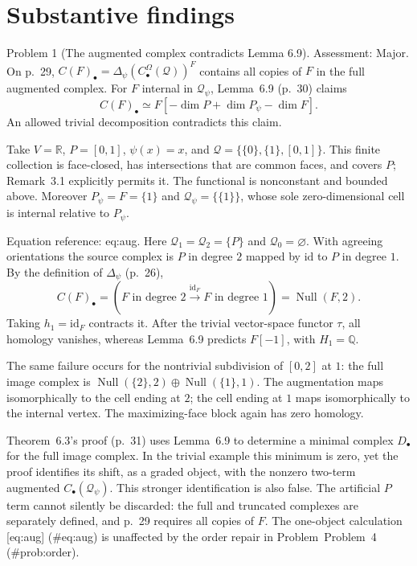 \documentclass[10pt]{article}
\begin{document}
\section*{Substantive findings}
Problem 1 (The augmented complex contradicts Lemma 6.9).  Assessment: Major. On p. 29, \(C(F)_\bullet=\Delta_\psi(C_\bullet^\Omega(\mathcal Q))^F\) contains all copies of \(F\) in the full augmented complex. For \(F\) internal in \(\mathcal Q_\psi\), Lemma 6.9 (p. 30) claims \[C(F)_\bullet\simeq F[-\dim P+\dim P_\psi-\dim F].\] An allowed trivial decomposition contradicts this claim.\par
Take \(V=\mathbb R\), \(P=[0,1]\), \(\psi(x)=x\), and \(\mathcal Q=\{\{0\},\{1\},[0,1]\}\). This finite collection is face-closed, has intersections that are common faces, and covers \(P\); Remark 3.1 explicitly permits it. The functional is nonconstant and bounded above. Moreover \(P_\psi=F=\{1\}\) and \(\mathcal Q_\psi=\{\{1\}\}\), whose sole zero-dimensional cell is internal relative to \(P_\psi\).\par
Equation reference: eq:aug. Here \(\mathcal Q_1=\mathcal Q_2=\{P\}\) and \(\mathcal Q_0=\varnothing\). With agreeing orientations the source complex is \(P\) in degree \(2\) mapped by \(\mathrm{id}\) to \(P\) in degree \(1\). By the definition of \(\Delta_\psi\) (p. 26), \[
 C(F)_\bullet=(F\text{ in degree }2
       \xrightarrow{\mathrm{id}_F}F\text{ in degree }1)=\operatorname{Null}(F,2).\] Taking \(h_1=\mathrm{id}_F\) contracts it. After the trivial vector-space functor \(\tau\), all homology vanishes, whereas Lemma 6.9 predicts \(F[-1]\), with \(H_1=\mathbb Q\).\par
The same failure occurs for the nontrivial subdivision of \([0,2]\) at \(1\): the full image complex is \(\operatorname{Null}(\{2\},2)\oplus\operatorname{Null}(\{1\},1)\). The augmentation maps isomorphically to the cell ending at \(2\); the cell ending at \(1\) maps isomorphically to the internal vertex. The maximizing-face block again has zero homology.\par
Theorem 6.3’s proof (p. 31) uses Lemma 6.9 to determine a minimal complex \(D_\bullet\) for the full image complex. In the trivial example this minimum is zero, yet the proof identifies its shift, as a graded object, with the nonzero two-term augmented \(C_\bullet(\mathcal Q_\psi)\). This stronger identification is also false. The artificial \(P\) term cannot silently be discarded: the full and truncated complexes are separately defined, and p. 29 requires all copies of \(F\). The one-object calculation [eq:aug] (\#eq:aug) is unaffected by the order repair in Problem Problem 4 (\#prob:order).\par
\end{document}
